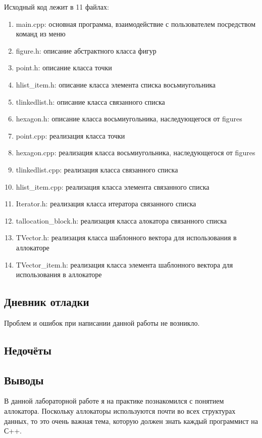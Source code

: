 \documentclass[12pt]{article}
\begin{document}
Исходный код лежит в 11 файлах:
\begin{enumerate}
\item main.cpp: основная программа, взаимодействие с пользователем посредством команд из меню
\item figure.h:    описание абстрактного класса фигур
\item point.h:     описание класса точки
\item hlist\_item.h:  описание класса элемента списка восьмиугольника
\item tlinkedlist.h: описание класса связанного списка
\item hexagon.h: описание класса восьмиугольника, наследующегося от figures
\item point.cpp:     реализация класса точки
\item hexagon.cpp: реализация класса восьмиугольника, наследующегося от figures
\item tlinkedlist.cpp:  реализация класса связанного списка
\item hlist\_item.cpp:  реализация класса элемента связанного списка
\item Iterator.h:  реализация класса итератора связанного списка
\item tallocation\_block.h:  реализация класса алокатора связанного списка
\item TVector.h:  реализация класса шаблонного вектора для использования в аллокаторе
\item TVector\_item.h:  реализация класса элемента шаблонного вектора для использования в аллокаторе

\end{enumerate}
\pagebreak
\subsection*{Дневник отладки}
Проблем и ошибок при написании данной работы не возникло.

\subsection*{Недочёты}


\subsection*{Выводы}
В данной лабораторной работе я на практике познакомился с понятием аллокатора. Поскольку аллокаторы используются почти во всех структурах данных, то это очень важная тема, которую должен знать каждый программист на С++.
\end{document}
